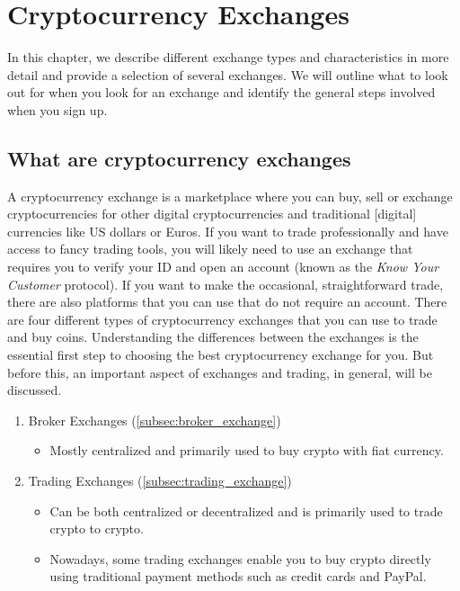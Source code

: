 \chapter{Cryptocurrency Exchanges}
\label{ch:exchanges}

In this chapter, we describe different exchange types and characteristics in more detail and provide a selection of several exchanges. We will outline what to look out for when you look for an exchange and identify the general steps involved when you sign up.

\medskip

\section{What are cryptocurrency exchanges}
A cryptocurrency exchange is a marketplace where you can buy, sell or exchange cryptocurrencies for other digital cryptocurrencies and traditional [digital] currencies like US dollars or Euros. If you want to trade professionally and have access to fancy trading tools, you will likely need to use an exchange that requires you to verify your ID and open an account (known as the \emph{Know Your Customer} protocol). If you want to make the occasional, straightforward trade, there are also platforms that you can use that do not require an account. There are four different types of cryptocurrency exchanges that you can use to trade and buy coins. Understanding the differences between the exchanges is the essential first step to choosing the best cryptocurrency exchange for you. But before this, an important aspect of exchanges and trading, in general, will be discussed.

\begin{enumerate}[label=(\alph*)]
  \setlength\itemsep{0em}
    \item Broker Exchanges (\cref{subsec:broker_exchange})
        \begin{itemize}
            \item Mostly centralized and primarily used to buy crypto with fiat currency. %
        \end{itemize}
    \item Trading Exchanges (\cref{subsec:trading_exchange})
        \begin{itemize}
            \item Can be both centralized or decentralized and is primarily used to trade crypto to crypto.
            \item Nowadays, some trading exchanges enable you to buy crypto directly using traditional payment methods such as credit cards and PayPal. %
            \end{itemize}
\end{enumerate}

